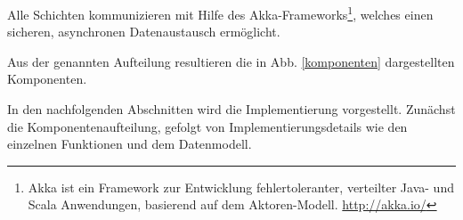%
%
%

Alle Schichten kommunizieren mit Hilfe des Akka-Frameworks\footnote{Akka ist ein Framework zur Entwicklung fehlertoleranter, verteilter Java- und Scala Anwendungen, basierend auf dem Aktoren-Modell. \url{http://akka.io/}}, welches einen sicheren,
asynchronen Datenaustausch ermöglicht.

Aus der genannten Aufteilung resultieren die in Abb. \ref{komponenten}
dargestellten Komponenten.

In den nachfolgenden Abschnitten wird die Implementierung \NewsGenie vorgestellt. Zunächst die Komponentenaufteilung, gefolgt von Implementierungsdetails wie den einzelnen Funktionen und dem Datenmodell.

